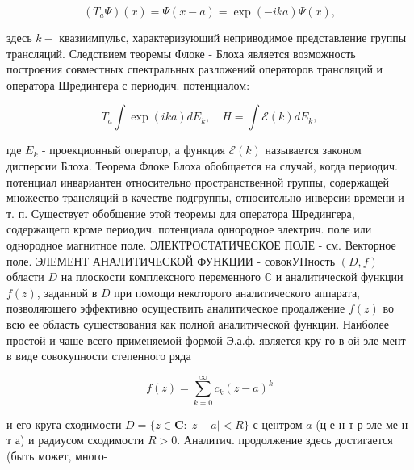 \documentclass[10pt]{article}
\begin{document}
\[

\left(T_{a} \Psi\right)(x)=\Psi(x-a)=\exp (-i k a) \Psi(x),

\]



здесь $\dot{k}-$ квазиимпульс, характеризующий неприводимое представление группы трансляций. Следствием теоремы Флоке - Блоха является возможность построения совместных спектральных разложений операторов трансляций и оператора Шредингера с периодич. потенциалом:



\[

T_{a} \int \exp (i k a) d E_{k}, \quad H=\int \mathscr{E}(k) d E_{k},

\]



где $E_{k}$ - проекционный оператор, а функция $\mathscr{E}(k)$ называется законом дисперсии Блоха. Теорема Флоке Блоха обобщается на случай, когда периодич. потенциал инвариантен относительно пространственной группы, содержащей множество трансляций в качестве подгруппы, относительно инверсии времени и т. п. Существует обобщение этой теоремы для оператора Шредингера, содержащего кроме периодич. потенциала однородное электрич. поле или однородное магнитное поле. ЭЛЕКТРОСТАТИЧЕСКОЕ ПОЛЕ - см. Векторное поле. ЭЛЕМЕНТ АНАЛИТИЧЕСКОЙ ФУНКЦИИ - совокУПность $(D, f)$ области $D$ на плоскости комплексного переменного $\mathbb{C}$ и аналитической функции $f(z)$, заданной в $D$ при помощи некоторого аналитического аппарата, позволяющего эффективно осуществить аналитическое продалжение $f(z)$ во всю ее область существования как полной аналитической функции. Наиболее простой и чаше всего применяемой формой Э.а.ф. является кру го в ой эле мент в виде совокупности степенного ряда



\[

f(z)=\sum_{k=0}^{\infty} c_{k}(z-a)^{k}

\]



и его круга сходимости $D=\{z \in \mathbf{C}:|z-a|<R\}$ с центром $a$ (ц е н т р эле ме н т а) и радиусом сходимости $R>0$. Аналитич. продолжение здесь достигается (быть может, много-
\end{document}
